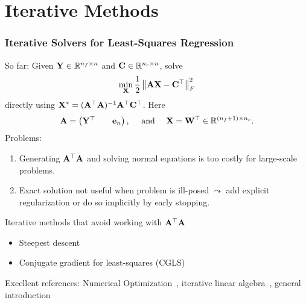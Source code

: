 \documentclass[12pt,fleqn,handout]{beamer}
\begin{document}
%
%
%
%
%
%


\section{Iterative Methods} %
\label{sec:iterative_methods}
\begin{frame}\frametitle{Iterative Solvers for Least-Squares Regression}
	So far: Given ${\bf Y}\in \mathbb{R}^{n_f\times n}$ and ${\bf C}\in\mathbb{R}^{n_c\times n}$, solve
	$$
	\min_{{\bf X}}  \frac12\left\|  {\bf A}   {\bf X}  -  {\bf C}^\top \right\|_F^2
	$$
	directly using ${\bf X}^* = ({\bf A}^{\top} {\bf A})^{-1}{\bf A}^{\top} {\bf C}^\top$. Here
	$$
		{\bf A} = \begin{pmatrix}
			{\bf Y}^\top && {\bf e}_n
		\end{pmatrix}, \quad \text{ and } \quad 
		{\bf X} = {\bf W}^\top \in \mathbb{R}^{(n_f+1)\times n_c}.
	$$
	Problems:
	\begin{enumerate}
		\item Generating  ${\bf A}^{\top}{\bf A}$ and solving normal equations is too costly for large-scale problems.
		\item Exact solution not useful when problem is ill-posed $\leadsto$ add explicit regularization or do so implicitly by early stopping.
	\end{enumerate} 
	
	\pause
Iterative methods that avoid working with ${\bf A}^{\top}{\bf A}$ 
\begin{itemize}
\item Steepest descent 
\item Conjugate gradient for least-squares (CGLS)
\end{itemize}
Excellent references: Numerical Optimization~\cite{NocedalWright2006}, iterative linear algebra~\cite{Saad2003}, general introduction \cite{AscherGreif2011}
\end{frame}
\end{document}
